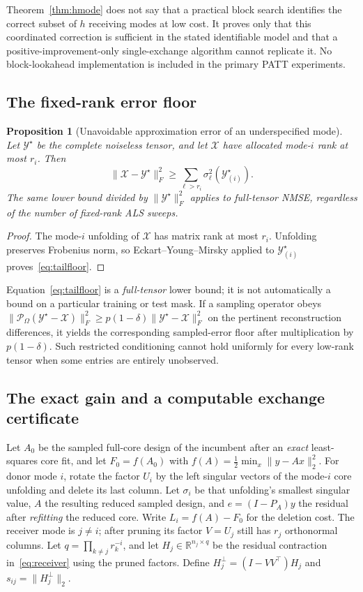 \documentclass[review,10pt]{elsarticle}
\newtheorem{proposition}{Proposition}
\newcommand{\cX}{\mathcal X}
\newcommand{\cY}{\mathcal Y}
\newcommand{\R}{\mathbb R}
\begin{document}
Theorem~\ref{thm:hmode} does not say that a practical block search identifies the correct subset of $h$ receiving modes at low cost. It proves only that this coordinated correction is sufficient in the stated identifiable model and that a positive-improvement-only single-exchange algorithm cannot replicate it. No block-lookahead implementation is included in the primary PATT experiments.

\subsection{The fixed-rank error floor}\label{subsec:floor}
\begin{proposition}[Unavoidable approximation error of an underspecified mode]\label{prop:floor}
Let $\cY^\star$ be the complete noiseless tensor, and let $\cX$ have allocated mode-$i$ rank at most $r_i$. Then
\begin{equation}\label{eq:tailfloor}
\|\cX-\cY^\star\|_F^2\ge\sum_{\ell>r_i}\sigma_\ell^2(\cY^\star_{(i)}).
\end{equation}
The same lower bound divided by $\|\cY^\star\|_F^2$ applies to full-tensor NMSE, regardless of the number of fixed-rank ALS sweeps.
\end{proposition}
\begin{proof}
The mode-$i$ unfolding of $\cX$ has matrix rank at most $r_i$. Unfolding preserves Frobenius norm, so Eckart--Young--Mirsky applied to $\cY^\star_{(i)}$ proves~\eqref{eq:tailfloor}.\end{proof}

Equation~\eqref{eq:tailfloor} is a \emph{full-tensor} lower bound; it is not automatically a bound on a particular training or test mask. If a sampling operator obeys $\|\mathcal P_\Omega(\cY^\star-\cX)\|_F^2\ge p(1-\delta)\|\cY^\star-\cX\|_F^2$ on the pertinent reconstruction differences, it yields the corresponding sampled-error floor after multiplication by $p(1-\delta)$. Such restricted conditioning cannot hold uniformly for every low-rank tensor when some entries are entirely unobserved.

\subsection{The exact gain and a computable exchange certificate}\label{subsec:gain}
Let $A_0$ be the sampled full-core design of the incumbent after an \emph{exact} least-squares core fit, and let $F_0=f(A_0)$ with $f(A)=\frac12\min_x\|y-Ax\|_2^2$. For donor mode $i$, rotate the factor $U_i$ by the left singular vectors of the mode-$i$ core unfolding and delete its last column. Let $\sigma_i$ be that unfolding's smallest singular value, $A$ the resulting reduced sampled design, and $e=(I-P_A)y$ the residual after \emph{refitting} the reduced core. Write $L_i=f(A)-F_0$ for the deletion cost. The receiver mode is $j\ne i$; after pruning its factor $V=U_j$ still has $r_j$ orthonormal columns. Let $q=\prod_{k\ne j}r_k^{-i}$, and let $H_j\in\R^{n_j\times q}$ be the residual contraction in~\eqref{eq:receiver} using the pruned factors. Define $H_j^\perp=(I-VV^\top)H_j$ and $s_{ij}=\|H_j^\perp\|_2$.
\end{document}
